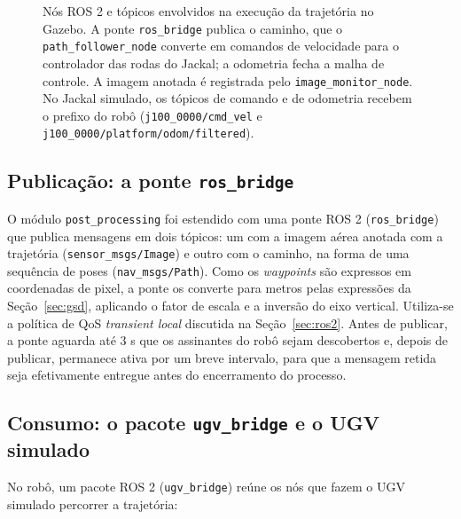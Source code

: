 \documentclass[
    12pt,
    openright,
    oneside,
    a4paper,
    english,
    brazil
]{abntex2}
\begin{document}
\begin{figure}[H]
{\begin{tikzpicture}
    \end{tikzpicture}}
    \caption{Nós ROS 2 e tópicos envolvidos na execução da trajetória no Gazebo. A ponte \texttt{ros\_\allowbreak{}bridge} publica o caminho, que o \texttt{path\_\allowbreak{}follower\_\allowbreak{}node} converte em comandos de velocidade para o controlador das rodas do Jackal; a odometria fecha a malha de controle. A imagem anotada é registrada pelo \texttt{image\_\allowbreak{}monitor\_\allowbreak{}node}. No Jackal simulado, os tópicos de comando e de odometria recebem o prefixo do robô (\texttt{j100\_\allowbreak{}0000/\allowbreak{}cmd\_\allowbreak{}vel} e \texttt{j100\_\allowbreak{}0000/\allowbreak{}platform/\allowbreak{}odom/\allowbreak{}filtered}).}
    \label{fig:ros_fluxo}
\end{figure}

\subsection{Publicação: a ponte \texttt{ros\_\allowbreak{}bridge}}

O módulo \texttt{post\_\allowbreak{}processing} foi estendido com uma ponte ROS 2 (\texttt{ros\_\allowbreak{}bridge}) que publica mensagens em dois tópicos: um com a imagem aérea anotada com a trajetória (\texttt{sensor\_\allowbreak{}msgs/\allowbreak{}Image}) e outro com o caminho, na forma de uma sequência de poses (\texttt{nav\_\allowbreak{}msgs/\allowbreak{}Path}). Como os \textit{waypoints} são expressos em coordenadas de pixel, a ponte os converte para metros pelas expressões da Seção~\ref{sec:gsd}, aplicando o fator de escala e a inversão do eixo vertical. Utiliza-se a política de QoS \textit{transient local} discutida na Seção~\ref{sec:ros2}. Antes de publicar, a ponte aguarda até 3 s que os assinantes do robô sejam descobertos e, depois de publicar, permanece ativa por um breve intervalo, para que a mensagem retida seja efetivamente entregue antes do encerramento do processo.

\subsection{Consumo: o pacote \texttt{ugv\_\allowbreak{}bridge} e o UGV simulado}

No robô, um pacote ROS 2 (\texttt{ugv\_\allowbreak{}bridge}) reúne os nós que fazem o UGV simulado percorrer a trajetória:
\end{document}
